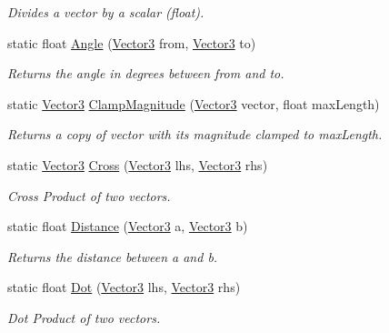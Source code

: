 \begin{DoxyCompactItemize}
\begin{DoxyCompactList}\small\item\em Divides a vector by a scalar (float). \end{DoxyCompactList}\item 
static float \mbox{\hyperlink{class_lua_1_1_vector3_ab278cbf1ea74ca78089e58c0a4313c6a}{Angle}} (\mbox{\hyperlink{class_lua_1_1_vector3}{Vector3}} from, \mbox{\hyperlink{class_lua_1_1_vector3}{Vector3}} to)
\begin{DoxyCompactList}\small\item\em Returns the angle in degrees between from and to. \end{DoxyCompactList}\item 
static \mbox{\hyperlink{class_lua_1_1_vector3}{Vector3}} \mbox{\hyperlink{class_lua_1_1_vector3_ab4ac1349372b28a8e490a94e96d950aa}{Clamp\+Magnitude}} (\mbox{\hyperlink{class_lua_1_1_vector3}{Vector3}} vector, float max\+Length)
\begin{DoxyCompactList}\small\item\em Returns a copy of vector with its magnitude clamped to max\+Length. \end{DoxyCompactList}\item 
static \mbox{\hyperlink{class_lua_1_1_vector3}{Vector3}} \mbox{\hyperlink{class_lua_1_1_vector3_aada99c9426a2253aed6e6a150efade76}{Cross}} (\mbox{\hyperlink{class_lua_1_1_vector3}{Vector3}} lhs, \mbox{\hyperlink{class_lua_1_1_vector3}{Vector3}} rhs)
\begin{DoxyCompactList}\small\item\em Cross Product of two vectors. \end{DoxyCompactList}\item 
static float \mbox{\hyperlink{class_lua_1_1_vector3_a8c4bd7e288f7857355aff2f159e86b83}{Distance}} (\mbox{\hyperlink{class_lua_1_1_vector3}{Vector3}} a, \mbox{\hyperlink{class_lua_1_1_vector3}{Vector3}} b)
\begin{DoxyCompactList}\small\item\em Returns the distance between a and b. \end{DoxyCompactList}\item 
static float \mbox{\hyperlink{class_lua_1_1_vector3_aee6533ff540a011a854efbbe29664fe4}{Dot}} (\mbox{\hyperlink{class_lua_1_1_vector3}{Vector3}} lhs, \mbox{\hyperlink{class_lua_1_1_vector3}{Vector3}} rhs)
\begin{DoxyCompactList}\small\item\em Dot Product of two vectors. \end{DoxyCompactList}\item 

\end{DoxyCompactItemize}
